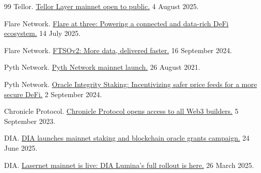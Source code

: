 \begin{thebibliography}{99}
Tellor.
\href{https://tellor.io/blog/layer-mainnet-open-to-public/}{Tellor Layer mainnet open to public.}
4 August 2025.


Flare Network.
\href{https://flare.network/news/flare-third-anniversary}{Flare at three: Powering a connected and data-rich DeFi ecosystem.}
14 July 2025.


Flare Network.
\href{https://flare.network/news/ftsov2-more-data-delivered-faster}{FTSOv2: More data, delivered faster.}
16 September 2024.


Pyth Network.
\href{https://www.pyth.network/blog/pyth-network-mainnet}{Pyth Network mainnet launch.}
26 August 2021.


Pyth Network.
\href{https://www.pyth.network/blog/oracle-integrity-staking-incentivizing-safer-price-feeds-for-a-more-secure-defi}{Oracle Integrity Staking: Incentivizing \linebreak safer price feeds for a more secure DeFi.}
2 September 2024.


Chronicle Protocol.
\href{https://www.globenewswire.com/en/news-release/2023/09/05/2737624/0/en/Chronicle-Protocol-the-Exclusive-5B-Oracle-of-MakerDAO-Opens-Access-to-All-Web3-Builders.html}{Chronicle Protocol opens access to all Web3 builders.}
5 September 2023.


DIA.
\href{https://www.diadata.org/blog/post/mainnet-staking-blockchain-oracle-grants/}{DIA launches mainnet staking and blockchain oracle grants campaign.}
24 June 2025.


DIA.
\href{https://www.diadata.org/blog/post/dia-lumina-mainnet-live/}{Lasernet mainnet is live: DIA Lumina's full rollout is here.}
26 March 2025.


\end{thebibliography}
